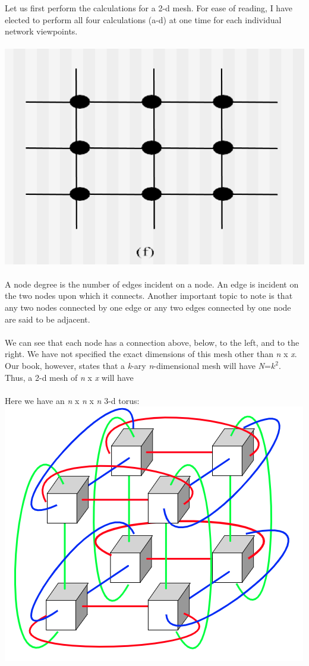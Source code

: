 \documentclass{article}
\begin{document}
Let us first perform the calculations for a 2-d mesh. For ease of reading, I have elected to perform all four calculations (a-d) at one time for each individual network viewpoints.\\\\ 
\includegraphics[width=\textwidth,height=\textheight,keepaspectratio]{2dmesh}
\\\\
A node degree is the number of edges incident on a node. An edge is incident on the two nodes upon which it connects. Another important topic to note is that any two nodes connected by one edge or any two edges connected by one node are said to be adjacent. 
\\ \\ 
We can see that each node has a connection above, below, to the left, and to the right. We have not specified the exact dimensions of this mesh other than \textit{n} x \textit{x}. Our book, however, states that a \textit{k}-ary \textit{n}-dimensional mesh will have \textit{N}=\textit{$k^2$}. Thus, a 2-d mesh of \textit{n} x \textit{x} will have
\\ \\
Here we have an \textit{n} x \textit{n} x \textit{n} 3-d torus:\\
\includegraphics[width=\textwidth,height=\textheight,keepaspectratio]{3dtorus}
\end{document}
